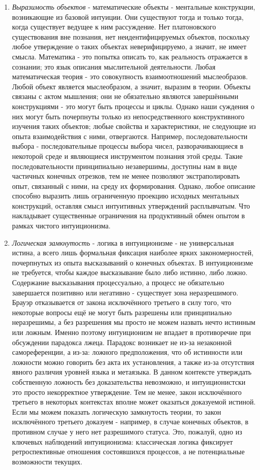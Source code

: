 \documentclass[12pt]{article}
\begin{document}
\begin{enumerate}
    \item {\it Выразимость объектов} - математические объекты - ментальные конструкции, возникающие из базовой интуиции. Они существуют тогда и только тогда, когда существует ведущее к ним рассуждение. Нет платоновского существования вне познания, нет неидентифицируемых объектов, поскольку любое утверждение о таких объектах неверифицируемо, а значит, не имеет смысла. Математика - это попытка описать то, как реальность отражается в сознании; это язык описания мыслительной деятельности. Любая математическая теория - это совокупность взаимоотношений мыслеобразов. Любой объект является мыслеобразом, а значит, выразим в теории. Объекты связаны с актом мышления; они не обязательно являются завершёнными конструкциями - это могут быть процессы и циклы. Однако наши суждения о них могут быть почерпнуты только из непосредственного конструктивного изучения таких объектов; любые свойства и характеристики, не следующие из опыта взаимодействия с ними, отвергаются. Например, последовательности выбора - последовательные процессы выбора чисел, разворачивающиеся в некоторой среде и являющиеся инструментом познания этой среды. Такие последовательности принципиально незавершимы, доступны нам в виде частичных конечных отрезков, тем не менее позволяют экстраполировать опыт, связанный с ними, на среду их формирования. Однако, любое описание способно выразить лишь ограниченную проекцию исходных ментальных конструкций, оставляя смысл интуитивных утверждений расплывчатым. Что накладывает существенные ограничения на продуктивный обмен опытом в рамках чистого интуиционизма.
    \item {\it Логическая замкнутость} - логика в интуиционизме - не универсальная истина, а всего лишь формальная фиксация наиболее ярких закономерностей, почерпнутых из опыта высказываний о конечных объектах. В интуиционизме не требуется, чтобы каждое высказывание было либо истинно, либо ложно. Содержание высказывания процессуально, а процесс не обязательно завершается позитивно или негативно - существует зона неразрешимого. Брауэр отказывается от закона исключённого третьего в силу того, что некоторые вопросы ещё не могут быть разрешены или принципиально неразрешимы, а без разрешения мы просто не можем назвать нечто истинным или ложным. Именно поэтому интуиционизм не впадает в противоречие при обсуждении парадокса лжеца. Парадокс возникает не из-за незаконной самореференции, а из-за: ложного предположения, что об истинности или ложности можно говорить без акта их установления, а также из-за отсутствия явного различия уровней языка и метаязыка. В данном контексте утверждать собственную ложность без доказательства невозможно, и интуиционистски это просто некорректное утверждение. Тем не менее, закон исключённого третьего в некоторых контекстах вполне может оказаться доказуемой истиной. Если мы можем показать логическую замкнутость теории, то закон исключённого третьего доказуем - например, в случае конечных объектов, в противном случае у него нет разрешимого статуса. Это, пожалуй, одно из ключевых наблюдений интуиционизма: классическая логика фиксирует ретроспективные отношения состоявшихся процессов, а не потенциальные возможности текущих.

\end{enumerate}
\end{document}
